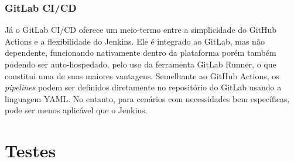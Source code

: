 \subsubsection*{GitLab CI/CD}
Já o GitLab CI/CD oferece um meio-termo entre a simplicidade do GitHub Actions e a flexibilidade do Jenkins. Ele é integrado ao GitLab, mas não dependente, funcionando nativamente dentro da plataforma porém também podendo ser auto-hospedado, pelo uso da ferramenta GitLab Runner, o que constitui uma de suas maiores vantagens. Semelhante ao GitHub Actions, os \emph{pipelines} podem ser definidos diretamente no repositório do GitLab usando a linguagem YAML. No entanto, para cenários com necessidades bem específicas, pode ser menos aplicável que o Jenkins.



\section{Testes}

